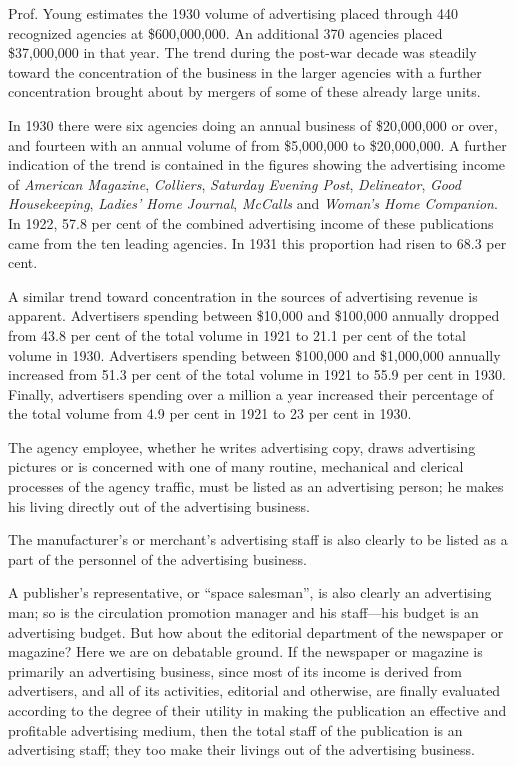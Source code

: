 \documentclass[nohyper,openany,nobib]{tufte-book}
\begin{document}
Prof. Young estimates the 1930 volume of advertising placed through 440
recognized agencies at \$600,000,000. An additional 370 agencies placed
\$37,000,000 in that year. The trend during the post-war decade was
steadily toward the concentration of the business in the larger agencies
with a further concentration brought about by mergers of some of these
already large units.

In 1930 there were six agencies doing an annual business of \$20,000,000
or over, and fourteen with an annual volume of from \$5,000,000 to
\$20,000,000. A further indication of the trend is contained in the
figures showing the advertising income of \emph{American Magazine},
\emph{Colliers}, \emph{Saturday Evening Post}, \emph{Delineator},
\emph{Good Housekeeping}, \emph{Ladies' Home Journal}, \emph{McCalls}
and \emph{Woman's Home Companion}. In 1922, 57.8 per cent of the
combined advertising income of these publications came from the ten
leading agencies. In 1931 this proportion had risen to 68.3 per cent.

A similar trend toward concentration in the sources of advertising
revenue is apparent. Advertisers spending between \$10,000 and \$100,000
annually dropped from 43.8 per cent of the total volume in 1921 to 21.1
per cent of the total volume in 1930. Advertisers spending between
\$100,000 and \$1,000,000 annually increased from 51.3 per cent of the
total volume in 1921 to 55.9 per cent in 1930. Finally, advertisers
spending over a million a year increased their percentage of the total
volume from 4.9 per cent in 1921 to 23 per cent in 1930.

The agency employee, whether he writes advertising copy, draws
advertising pictures or is concerned with one of many routine,
mechanical and clerical processes of the agency traffic, must be listed
as an advertising person; he makes his living directly out of the
advertising business.

The manufacturer's or merchant's advertising staff is also clearly to be
listed as a part of the personnel of the advertising business.

A publisher's representative, or ``space salesman'', is also clearly an
advertising man; so is the circulation promotion manager and his
staff---his budget is an advertising budget. But how about the editorial
department of the newspaper or magazine? Here we are on debatable
ground. If the newspaper or magazine is primarily an advertising
business, since most of its income is derived from advertisers, and all
of its activities, editorial and otherwise, are finally evaluated
according to the degree of their utility in making the publication an
effective and profitable advertising medium, then the total staff of the
publication is an advertising staff; they too make their livings out of
the advertising business.
\end{document}
